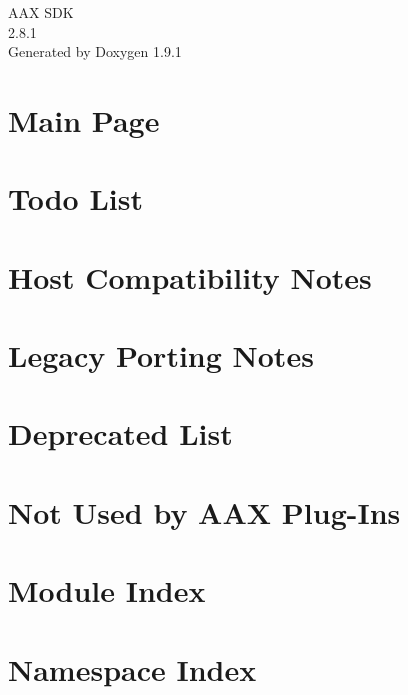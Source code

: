 \let\mypdfximage\pdfximage\def\pdfximage{\immediate\mypdfximage}\documentclass[twoside]{book}
\newcommand{\+}{\discretionary{\mbox{\scriptsize$\hookleftarrow$}}{}{}}
\newcommand{\clearemptydoublepage}{%
  \newpage{\pagestyle{empty}\cleardoublepage}%
}
\begin{document}
\raggedbottom

\hypersetup{pageanchor=false,
             bookmarksnumbered=true,
             pdfencoding=unicode
            }
\begin{titlepage}
\vspace*{7cm}
\begin{center}%
{\Large AAX SDK \\[1ex]\large 2.\+8.\+1 }\\
\vspace*{1cm}
{\large Generated by Doxygen 1.9.1}\\
\end{center}
\end{titlepage}
\clearemptydoublepage
{}
\tableofcontents
\clearemptydoublepage
{}
\hypersetup{pageanchor=true}

\chapter{Main Page}
\label{index}\hypertarget{index}{}
\chapter{Todo List}
\label{a00878}

\chapter{Host Compatibility Notes}
\label{a00879}

\chapter{Legacy Porting Notes}
\label{a00880}

\chapter{Deprecated List}
\label{a00881}

\chapter{Not Used by AAX Plug-\/\+Ins}
\label{a00882}

\chapter{Module Index}

\chapter{Namespace Index}

\end{document}
